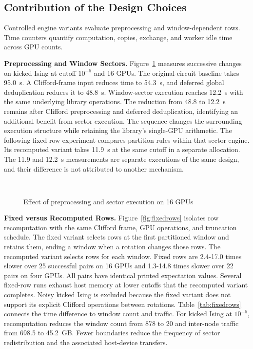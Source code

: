 \subsection{Contribution of the Design Choices}
\label{sec:design-eval}
Controlled engine variants evaluate preprocessing and window-dependent rows.
Time counters quantify computation, copies, exchange, and worker idle time across GPU counts.

\noindent\textbf{Preprocessing and Window Sectors.}
Figure~\ref{fig:staircase} measures successive changes on kicked Ising at cutoff $10^{-5}$ and 16 GPUs.
The original-circuit \cuPP baseline takes 95.0~s.
A Clifford-frame input reduces time to 54.3~s, and deferred global deduplication reduces it to 48.8~s.
Window-sector execution reaches 12.2~s with the same underlying library operations.
The reduction from 48.8 to 12.2~s remains after Clifford preprocessing and deferred deduplication, identifying an additional benefit from sector execution.
The sequence changes the surrounding execution structure while retaining the library's single-GPU arithmetic.
The following fixed-row experiment compares partition rules within that sector engine.
Its recomputed variant takes 11.9~s at the same cutoff in a separate allocation.
The 11.9 and 12.2~s measurements are separate executions of the same design, and their difference is not attributed to another mechanism.

\begin{figure}[t]
\centering
{}\\[-2pt]
\caption{Effect of preprocessing and sector execution on 16 GPUs}
\label{fig:staircase}
\end{figure}

\noindent\textbf{Fixed versus Recomputed Rows.}
Figure~\ref{fig:fixedrows} isolates row recomputation with the same Clifford frame, GPU operations, and truncation schedule.
The fixed variant selects rows at the first partitioned window and retains them, ending a window when a rotation changes those rows.
The recomputed variant selects rows for each window.
Fixed rows are 2.4-17.0 times slower over 25 successful pairs on 16 GPUs and 1.3-14.8 times slower over 22 pairs on four GPUs.
All pairs have identical printed expectation values.
Several fixed-row runs exhaust host memory at lower cutoffs that the recomputed variant completes.
Noisy kicked Ising is excluded because the fixed variant does not support its explicit Clifford operations between rotations.
Table~\ref{tab:fixedrows} connects the time difference to window count and traffic.
For kicked Ising at $10^{-5}$, recomputation reduces the window count from 878 to 20 and inter-node traffic from 698.5 to 45.2~GB.
Fewer boundaries reduce the frequency of sector redistribution and the associated host-device transfers.

